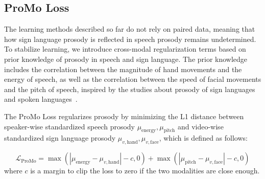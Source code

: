 \subsection{ProMo Loss}
\label{sec:PGR}
The learning methods described so far do not rely on paired data, meaning that how sign language prosody is reflected in speech prosody remains undetermined. To stabilize learning, we introduce cross-modal regularization terms based on prior knowledge of prosody in speech and sign language. The prior knowledge includes the correlation between the magnitude of hand movements and the energy of speech, as well as the correlation between the speed of facial movements and the pitch of speech, inspired by the studies about prosody of sign languages and spoken languages~\cite{Wilbur1999,Limousin2010}.

The ProMo Loss regularizes prosody by minimizing the L1 distance between speaker-wise standardized speech prosody $\mu_{\mathrm{energy}}, \mu_{\mathrm{pitch}}$ and video-wise standardized sign language prosody $\mu_{v, \mathrm{hand}}, \mu_{v, \mathrm{face}}$, which is defined as follows:

\begin{equation}\label{eq:pro_mo}
    \mathcal{L}_{\mathrm{ProMo}}=\max\left(\left|\mu_{\mathrm{energy}} - \mu_{v, \mathrm{hand}}\right| - c, 0\right) + \max\left(\left|\mu_{\mathrm{pitch}} - \mu_{v, \mathrm{face}}\right| - c, 0 \right)
\end{equation}
where $c$ is a margin to clip the loss to zero if the two modalities are close enough.


